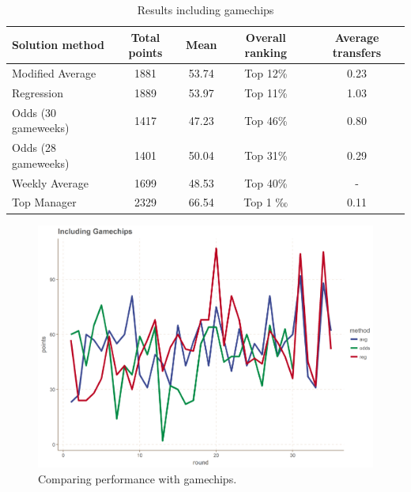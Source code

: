 \begin{table}[H]
\centering
\begin{tabular}{|l|c|c|c|c|}
\hline
Solution method     & Total points & Mean  & Overall ranking & Average transfers\\
\hline
Modified Average    & 1881         & 53.74 & Top 12\%   &  0.23   \\
Regression          & 1889         & 53.97 & Top 11\%   &  1.03   \\
Odds (30 gameweeks) & 1417         & 47.23 & Top 46\%   & 0.80   \\
Odds (28 gameweeks) & 1401         & 50.04 & Top 31\%   &  0.29   \\
Weekly Average      & 1699         & 48.53 & Top 40\%   &  - \\
Top Manager         & 2329      & 66.54     & Top 1 ‰   & 0.11\\
\hline
\end{tabular}
\caption{Results including gamechips}
\label{tab:res_incl_gamechips}
\end{table}


\begin{figure}[H]
    \centering
    \includegraphics[scale=0.5]{fig/chapter_7/comparison_methods_gc.png}
    \caption{Comparing performance with gamechips.}
\label{fig:res_comp_gamechips}    
\end{figure}

